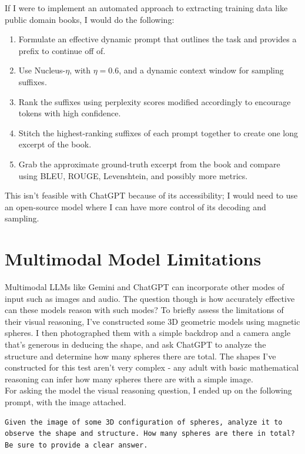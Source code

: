 \documentclass{article}
\begin{document}
	If I were to implement an automated approach to extracting training data like public domain books, I would do the following:
	\begin{enumerate}
		\item Formulate an effective dynamic prompt that outlines the task and provides a prefix to continue off of.
		\item Use Nucleus-$\eta$, with $\eta=0.6$, and a dynamic context window for sampling suffixes.
		\item Rank the suffixes using perplexity scores modified accordingly to encourage tokens with high confidence.
		\item Stitch the highest-ranking suffixes of each prompt together to create one long excerpt of the book.
		\item Grab the approximate ground-truth excerpt from the book and compare using BLEU, ROUGE, Levenshtein, and possibly more metrics.
	\end{enumerate}

	This isn't feasible with ChatGPT because of its accessibility; I would need to use an open-source model where I can have more control of its decoding and sampling.
	
	\section{Multimodal Model Limitations}
	Multimodal LLMs like Gemini and ChatGPT can incorporate other modes of input such as images and audio. The question though is how accurately effective can these models reason with such modes? To briefly assess the limitations of their visual reasoning, I've constructed some 3D geometric models using magnetic spheres. I then photographed them with a simple backdrop and a camera angle that's generous in deducing the shape, and ask ChatGPT to analyze the structure and determine how many spheres there are total. The shapes I've constructed for this test aren't very complex - any adult with basic mathematical reasoning can infer how many spheres there are with a simple image.
	\\
	
	For asking the model the visual reasoning question, I ended up on the following prompt, with the image attached.
	\begin{lstlisting}
Given the image of some 3D configuration of spheres, analyze it to observe the shape and structure. How many spheres are there in total? Be sure to provide a clear answer.
	\end{lstlisting}
	
\end{document}
